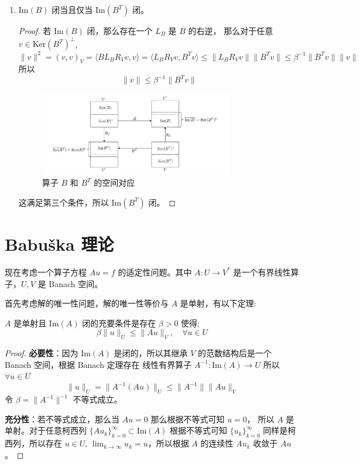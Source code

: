 \documentclass[lang=cn,a4paper,newtx]{elegantpaper}
\begin{document}
\begin{enumerate}
\item $\mathrm{Im}(B)$ 闭当且仅当 $\mathrm{Im}(B^T)$ 闭。
    \begin{proof}
        若 $\mathrm{Im}(B)$ 闭，那么存在一个 $L_B$ 是 $B$ 的右逆，
        那么对于任意 $v \in \mathrm{Ker}(B^T)^{\perp}$, 
        $$
        \|v\|^2 = (v, v)_V = \langle BL_BR_Vv,  v\rangle =
        \langle L_BR_Vv,  B^T v\rangle \leq \|L_BR_Vv\|\|B^Tv\| 
        \leq \beta^{-1}\|B^Tv\|\|v\|
        $$
        所以 
        $$
        \|v\| \leq \beta^{-1}\|B^Tv\|
        $$
        \begin{figure}[h]
            \centering
            \includegraphics[width=0.8\textwidth]{../figures/operator.pdf}
            \caption{算子 $B$ 和 $B^T$ 的空间对应}
        \end{figure}
        这满足第三个条件，所以 $\mathrm{Im}(B^T)$ 闭。
    \end{proof}

\end{enumerate}

\section{Babu\v{s}ka 理论}
现在考虑一个算子方程 $Au = f$ 的适定性问题。其中 $A: U \to V^*$
是一个有界线性算子，$U, V$ 是 Banach 空间。

首先考虑解的唯一性问题，解的唯一性等价与 $A$ 是单射，有以下定理:

\begin{theorem}
    $A$ 是单射且 $\mathrm{Im}(A)$ 闭的充要条件是存在 $\beta > 0$ 使得:
    $$
    \beta\|u\|_U \leq \|Au\|_V, \quad \forall u \in U
    $$
\end{theorem}
\begin{proof}
    \textbf{必要性}：因为 $\mathrm{Im}(A)$ 是闭的，所以其继承 $V$ 的范数结构后是一个
    Banach 空间，根据 Banach 定理存在 线性有界算子 $A^{-1} : \mathrm{Im}(A) \to U$
    所以 $\forall u \in U$
    $$
    \|u\|_U = \|A^{-1}(Au)\|_U \leq \|A^{-1}\| \|Au\|_V
    $$
    令 $\beta = \|A^{-1}\|^{-1}$ 不等式成立。

    \textbf{充分性}：若不等式成立，那么当 $Au = 0$ 那么根据不等式可知 $u = 0$，
    所以 $A$ 是单射。对于任意柯西列 $\{A u_k\}_{k=0}^{\infty} \subset
    \mathrm{Im}(A)$ 根据不等式可知 $\{u_k\}_{k=0}^{\infty}$ 同样是柯西列，所以存在
    $u \in U$, $\lim_{k\to\infty} u_k = u$，所以根据 $A$ 的连续性 $Au_k$ 收敛于
    $Au$。
\end{proof}
\end{document}

